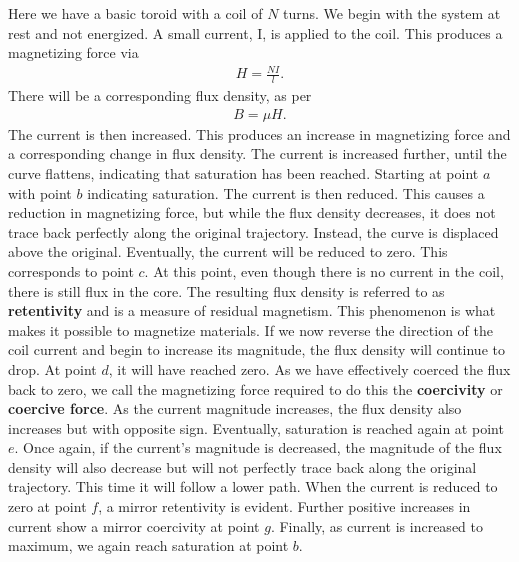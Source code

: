\documentclass{report}
\begin{document}
\begin{itemize}
            \bigbreak \noindent 
            \bigbreak \noindent 
            Here we have a basic toroid with a coil of $N$ turns. We begin with the system at rest and not energized. A small current, I, is applied to the coil. This produces a magnetizing force via
            \begin{align*}
                H = \frac{NI}{l}
            .\end{align*}
            There will be a corresponding flux density, as per
            \begin{align*}
                B = \mu H
            .\end{align*}
            The current is then increased. This produces an increase in magnetizing force and a corresponding change in flux density. The current is increased further, until the curve flattens, indicating that saturation has been reached.
            \bigbreak \noindent 
            \bigbreak \noindent
            Starting at point $a$ with point $b$ indicating saturation. The current is then reduced. This causes a reduction in magnetizing force, but while the flux density decreases, it does not trace back perfectly along the original trajectory. Instead, the curve is displaced above the original.
            \bigbreak \noindent 
            Eventually, the current will be reduced to zero. This corresponds to point $c$. At this point, even though there is no current in the coil, there is still flux in the core. The resulting flux density is referred to as \textbf{retentivity} and is a measure of residual magnetism. This phenomenon is what makes it possible to magnetize materials. 
            \bigbreak \noindent 
            If we now reverse the direction of the coil current and begin to increase its magnitude, the flux density will continue to drop. At point $d$, it will have reached zero. As we have effectively coerced the flux back to zero, we call the magnetizing force required to do this the \textbf{coercivity} or \textbf{coercive force}.
            \bigbreak \noindent 
            As the current magnitude increases, the flux density also increases but with opposite sign. Eventually, saturation is reached again at point $e$. Once again, if the current's magnitude is decreased, the magnitude of the flux density will also decrease but will not perfectly trace back along the original trajectory. This time it will follow a lower path. When the current is reduced to zero at point $f$, a mirror retentivity is evident. Further positive increases in current show a mirror coercivity at point $g$. Finally, as current is increased to maximum, we again reach saturation at point $b$.

\end{itemize}
\end{document}
